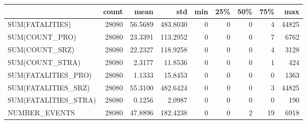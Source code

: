 \begin{tabular}{lrrrrrrrr}
\toprule
{} &  count &     mean &       std &  min &  25\% &  50\% &  75\% &    max \\
\midrule
SUM(FATALITIES)      &  28080 &  56.5689 &  483.8030 &    0 &    0 &    0 &    4 &  44825 \\
SUM(COUNT\_PRO)       &  28080 &  23.3391 &  113.2952 &    0 &    0 &    0 &    7 &   6762 \\
SUM(COUNT\_SRZ)       &  28080 &  22.2327 &  118.9258 &    0 &    0 &    0 &    4 &   3128 \\
SUM(COUNT\_STRA)      &  28080 &   2.3177 &   11.8536 &    0 &    0 &    0 &    1 &    424 \\
SUM(FATALITIES\_PRO)  &  28080 &   1.1333 &   15.8453 &    0 &    0 &    0 &    0 &   1363 \\
SUM(FATALITIES\_SRZ)  &  28080 &  55.3100 &  482.6424 &    0 &    0 &    0 &    3 &  44825 \\
SUM(FATALITIES\_STRA) &  28080 &   0.1256 &    2.0987 &    0 &    0 &    0 &    0 &    190 \\
NUMBER\_EVENTS        &  28080 &  47.8896 &  182.4238 &    0 &    0 &    2 &   19 &   6918 \\
\bottomrule
\end{tabular}
